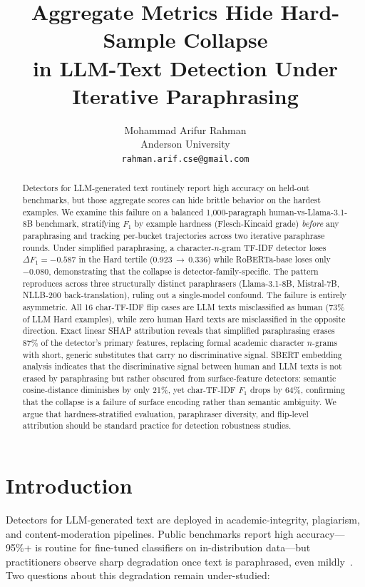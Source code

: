 \documentclass[11pt,a4paper]{article}
\title{\textbf{Aggregate Metrics Hide Hard-Sample Collapse \\
       in LLM-Text Detection Under Iterative Paraphrasing}}
\author{Mohammad Arifur Rahman \\
        Anderson University \\
        \texttt{rahman.arif.cse@gmail.com}}
\date{}
\begin{document}
\maketitle

\begin{abstract}
Detectors for LLM-generated text routinely report high accuracy on
held-out benchmarks, but those aggregate scores can hide brittle behavior
on the hardest examples. We examine this failure on a balanced
1{,}000-paragraph human-vs-Llama-3.1-8B benchmark, stratifying $F_1$ by
example hardness (Flesch-Kincaid grade) \emph{before} any paraphrasing
and tracking per-bucket trajectories across two iterative paraphrase
rounds. Under simplified paraphrasing, a character-$n$-gram TF-IDF
detector loses $\Delta F_1 = -0.587$ in the Hard tertile
(0.923\,$\to$\,0.336) while RoBERTa-base loses only $-0.080$,
demonstrating that the collapse is detector-family-specific. The pattern
reproduces across three structurally distinct paraphrasers
(Llama-3.1-8B, Mistral-7B, NLLB-200 back-translation), ruling out a
single-model confound. The failure is entirely asymmetric. All 16
char-TF-IDF flip cases are LLM texts misclassified as human (73\% of LLM
Hard examples), while zero human Hard texts are misclassified in the
opposite direction. Exact linear SHAP attribution reveals that simplified
paraphrasing erases 87\% of the detector's primary features, replacing
formal academic character $n$-grams with short, generic substitutes that
carry no discriminative signal. SBERT embedding analysis indicates that
the discriminative signal between human and LLM texts is not erased by
paraphrasing but rather obscured from surface-feature detectors: semantic
cosine-distance diminishes by only 21\%, yet char-TF-IDF $F_1$ drops by
64\%, confirming that the collapse is a failure of surface encoding rather
than semantic ambiguity. We argue that hardness-stratified evaluation,
paraphraser diversity, and flip-level attribution should be standard
practice for detection robustness studies.
\end{abstract}

\section{Introduction}

Detectors for LLM-generated text are deployed in academic-integrity,
plagiarism, and content-moderation pipelines.
Public benchmarks report high accuracy—95\%+ is routine for fine-tuned
classifiers on in-distribution data—but practitioners observe sharp
degradation once text is paraphrased, even
mildly~\citep{krishna2023paraphrasing,sadasivan2023can}.
Two questions about this degradation remain under-studied:
\end{document}
